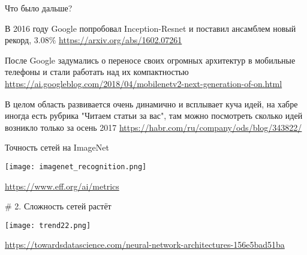 \documentclass[notes,12pt, aspectratio=169]{beamer}
\newenvironment{transitionframe}{
  \setbeamercolor{background canvas}{bg=yellow}
  \begin{frame}}{
    \end{frame}
}
\newenvironment{wideitemize}{\itemize\addtolength{\itemsep}{10pt}}{\enditemize}
\begin{document}



\begin{frame}{Что было дальше?}
\begin{wideitemize}
	\item  В  2016 году Google попробовал Inception-Resnet и поставил ансамблем новый рекорд, $3.08\%$ 
	\vfill
	{\color{blue} \url{https://arxiv.org/abs/1602.07261}}
	
	\vfill
	\item После Google задумались о переносе своих огромных архитектур в мобильные телефоны и стали работать над их компактностью 
	\vfill 
	{\color{blue} \url{https://ai.googleblog.com/2018/04/mobilenetv2-next-generation-of-on.html}}
	
	\vfill 
	\item  В целом область развивается очень динамично и всплывает куча идей, на хабре иногда есть рубрика "Читаем статьи за вас", там можно посмотреть сколько идей возникло только за осень 2017
	\vfill
	{\color{blue} \url{https://habr.com/ru/company/ods/blog/343822/}}	
\end{wideitemize}
\end{frame}


\begin{frame}{Точность сетей на ImageNet}
\begin{center}
	\texttt{[image: imagenet\_recognition.png]}
\end{center}
\vfill %
\footnotesize
\color{blue} \url{https://www.eff.org/ai/metrics}
\end{frame} 


\begin{frame}{\# 2. Сложность сетей растёт}
\begin{center}
	\texttt{[image: trend22.png]}
\end{center}
\vfill %
\footnotesize
\color{blue} \url{https://towardsdatascience.com/neural-network-architectures-156e5bad51ba}
\end{frame} 
\end{document}
